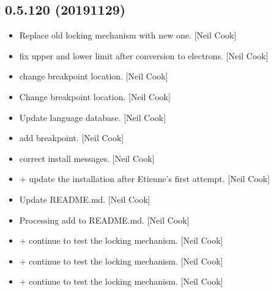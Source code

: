 \documentclass[a4paper,10pt,english]{report}
\begin{document}
\subsection{0.5.120 (2019\sphinxhyphen{}11\sphinxhyphen{}29)}
\label{\detokenize{misc/changelog:id41}}\begin{itemize}
\item {} 
Replace old locking mechanism with new one. {[}Neil Cook{]}

\item {} 
 \sphinxhyphen{} fix upper and lower limit after conversion
to electrons. {[}Neil Cook{]}

\item {} 
 \sphinxhyphen{} change breakpoint location. {[}Neil
Cook{]}

\item {} 
Change breakpoint location. {[}Neil Cook{]}

\item {} 
Update language database. {[}Neil Cook{]}

\item {} 
 \sphinxhyphen{} add breakpoint. {[}Neil Cook{]}

\item {} 
 \sphinxhyphen{} correct install messages.
{[}Neil Cook{]}

\item {} 
 +  \sphinxhyphen{}
update the installation after Etienne’s first attempt. {[}Neil Cook{]}

\item {} 
Update README.md. {[}Neil Cook{]}

\item {} 
Processing add to README.md. {[}Neil Cook{]}

\item {} 
 +  \sphinxhyphen{} continue to test the locking mechanism. {[}Neil
Cook{]}

\item {} 
 +  \sphinxhyphen{} continue to test the locking mechanism. {[}Neil
Cook{]}

\item {} 
 +  \sphinxhyphen{} continue to test the locking mechanism. {[}Neil
Cook{]}


\end{itemize}
\end{document}
